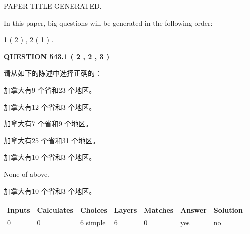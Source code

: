 \documentclass{ctexart}
\begin{document}
   
\vspace{0.2in}
   
   
   
   
   
   
   
   
 \vspace{0.2in}
 
 
 
 
   
   
 PAPER TITLE GENERATED.
   
   
   
\vspace{0.2in}
   
In this paper, big questions will be generated in the following order: 
   
   
   1 ( 2 )
 ,
   2 ( 1 )
 .
  
\vspace{0.2in}
  
{\textbf{\Large{QUESTION
543.1 
 ( 2 , 2 , 3 )
}}}
  
  
请从如下的陈述中选择正确的：
 
 
加拿大有9 个省和23 个地区。
 
 
加拿大有12 个省和3 个地区。
 
 
加拿大有7 个省和9 个地区。
 
 
加拿大有25 个省和31 个地区。
 
 
加拿大有10 个省和3 个地区。
 
 
 None of above.
 
 
\noindent{}
 
 
加拿大有10 个省和3 个地区。
 
 
\noindent{}
 
 
   
   
   
   
\noindent\begin{tabular}{|l|l|l|l|l|l|l|}
 \hline
Inputs & Calculates & Choices & Layers & Matches & Answer & Solution \\ \hline
 0  & 
 0  & 
 6
  simple  
  & 
 6  & 
 0  & 
  yes & 
  no 
  \\ \hline
 \end{tabular}
   
\end{document}
